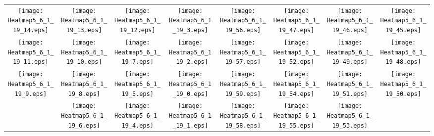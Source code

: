 \documentclass{standalone}
\begin{document}
\begin{tabular}{ *8{c} }
\texttt{[image: Heatmap5\_6\_1\_19\_14.eps]} & \texttt{[image: Heatmap5\_6\_1\_19\_13.eps]} & \texttt{[image: Heatmap5\_6\_1\_19\_12.eps]} & \texttt{[image: Heatmap5\_6\_1\_19\_3.eps]} & \texttt{[image: Heatmap5\_6\_1\_19\_56.eps]} & \texttt{[image: Heatmap5\_6\_1\_19\_47.eps]} & \texttt{[image: Heatmap5\_6\_1\_19\_46.eps]} & \texttt{[image: Heatmap5\_6\_1\_19\_45.eps]} \\
\texttt{[image: Heatmap5\_6\_1\_19\_11.eps]} & \texttt{[image: Heatmap5\_6\_1\_19\_10.eps]} & \texttt{[image: Heatmap5\_6\_1\_19\_7.eps]} & \texttt{[image: Heatmap5\_6\_1\_19\_2.eps]} & \texttt{[image: Heatmap5\_6\_1\_19\_57.eps]} & \texttt{[image: Heatmap5\_6\_1\_19\_52.eps]} & \texttt{[image: Heatmap5\_6\_1\_19\_49.eps]} & \texttt{[image: Heatmap5\_6\_1\_19\_48.eps]} \\
\texttt{[image: Heatmap5\_6\_1\_19\_9.eps]} & \texttt{[image: Heatmap5\_6\_1\_19\_8.eps]} & \texttt{[image: Heatmap5\_6\_1\_19\_5.eps]} & \texttt{[image: Heatmap5\_6\_1\_19\_0.eps]} & \texttt{[image: Heatmap5\_6\_1\_19\_59.eps]} & \texttt{[image: Heatmap5\_6\_1\_19\_54.eps]} & \texttt{[image: Heatmap5\_6\_1\_19\_51.eps]} & \texttt{[image: Heatmap5\_6\_1\_19\_50.eps]} \\
 & \texttt{[image: Heatmap5\_6\_1\_19\_6.eps]} & \texttt{[image: Heatmap5\_6\_1\_19\_4.eps]} & \texttt{[image: Heatmap5\_6\_1\_19\_1.eps]} & \texttt{[image: Heatmap5\_6\_1\_19\_58.eps]} & \texttt{[image: Heatmap5\_6\_1\_19\_55.eps]} & \texttt{[image: Heatmap5\_6\_1\_19\_53.eps]} &  
\end{tabular}
\end{document}
